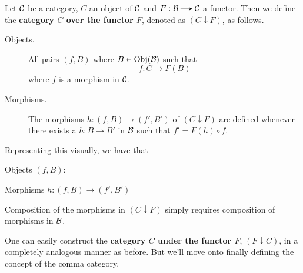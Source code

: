         \begin{definition}
            Let $\mathcal{C}$ be a category, $C$ an object of $\mathcal{C}$ and $F: 
            \bb \to \cc$ a functor. Then we define the \textbf{category $C$
            over the functor $F$}, denoted as $(C \downarrow F)$,
            as follows. 
            \begin{description}
                \item[Objects.] All
                pairs $(f, B)$ where $B \in \text{Obj}(\mathcal{B})$ such
                that 
                \[
                    f : C \to F(B)
                \]
                where $f$ is a morphism in $\mathcal{C}$. 

                \item[Morphisms.] The morphisms $h: (f, B) \to (f', B')$ of
                $(C \downarrow F)$ are defined whenever there exists a
                $h:B \to B'$ in $\mathcal{B}$ such that $f' = F(h) \circ f$. 
            \end{description}
        \end{definition}
        Representing this visually, we have that 
        \begin{center}
            Objects $(f, B)$:
            \hspace{1cm}
            Morphisms $h: (f, B) \to (f', B')$
        \end{center}
        Composition of the morphisms in $(C \downarrow F)$ simply
        requires composition of morphisms in $\mathcal{B}$. 

        One can easily construct the \textbf{category $C$ under the
        functor $F$}, $(F \downarrow C)$, in a completely analogous
        manner as before. But we'll move onto finally defining the
        concept of the comma category. 

